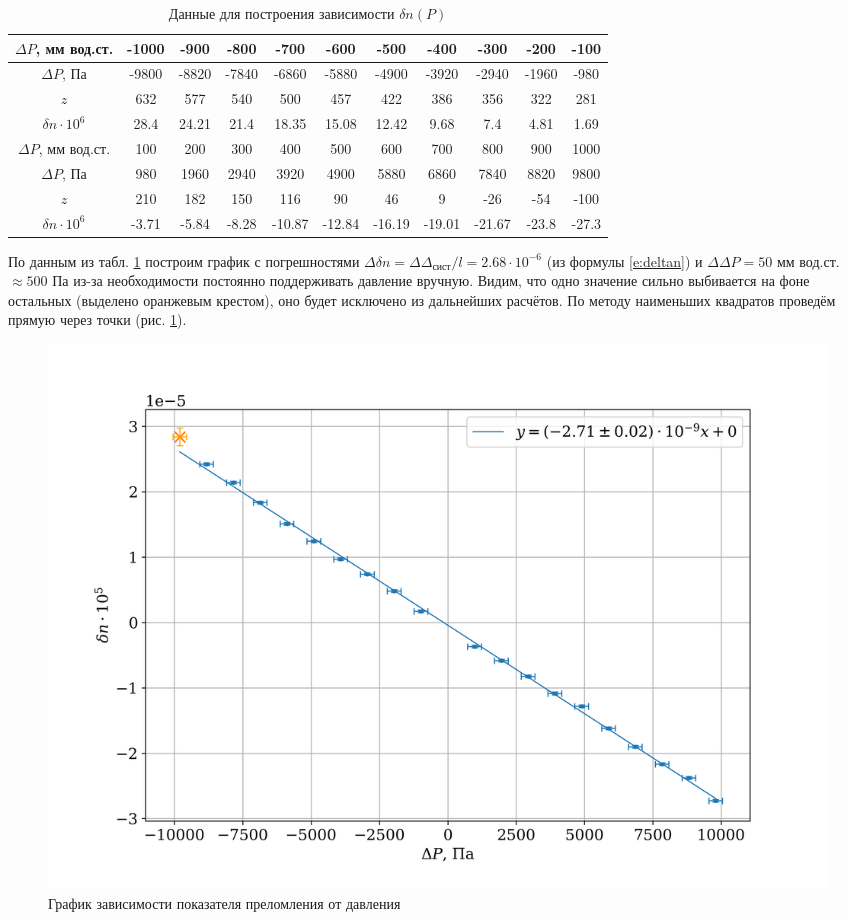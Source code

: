 \documentclass[a4paper,12pt]{article} %
\begin{document}
\begin{table}
\centering
\footnotesize
\begin{tabular}{|c|c|c|c|c|c|c|c|c|c|c|}
\hline 
$\Delta P$, мм вод.ст. & -1000 & -900 & -800 & -700 & -600 & -500 & -400 & -300 & -200 & -100\\
\hline
$\Delta P$, Па & -9800 & -8820 & -7840 & -6860 & -5880 & -4900 & -3920 & -2940 & -1960 & -980\\
\hline
$z$ & 632 & 577 & 540 & 500 & 457 & 422 & 386 & 356 & 322 & 281\\
\hline
$\delta n \cdot 10^6$ & 28.4 & 24.21 & 21.4 & 18.35 & 15.08 & 12.42 & 9.68 & 7.4 & 4.81 & 1.69\\
\hline
$\Delta P$, мм вод.ст. & 100 & 200 & 300 & 400 & 500 & 600 & 700 & 800 & 900 & 1000\\
\hline
$\Delta P$, Па & 980 & 1960 & 2940 & 3920 & 4900 & 5880 & 6860 & 7840 & 8820 & 9800\\
\hline
$z$ & 210 & 182 & 150 & 116 & 90 & 46 & 9 & -26 & -54 & -100\\
\hline
$\delta n \cdot 10^6$ & -3.71 & -5.84 & -8.28 & -10.87 & -12.84 & -16.19 & -19.01 & -21.67 & -23.8 & -27.3\\
\hline
\end{tabular} 
\caption{Данные для построения зависимости $\delta n (P)$}
\label{t:pres}
\end{table}

По данным из табл. \ref{t:pres} построим график с погрешностями $\Delta \delta n = \Delta \Delta_\text{сист} / l = 2.68 \cdot 10^{-6}$ (из формулы \ref{e:deltan}) и $\Delta \Delta P = 50$ мм вод.ст. $\approx 500$ Па из-за необходимости постоянно поддерживать давление вручную. Видим, что одно значение сильно выбивается на фоне остальных (выделено оранжевым крестом), оно будет исключено из дальнейших расчётов. По методу наименьших квадратов проведём прямую через точки (рис. \ref{f:pres}).

\begin{figure}
\centering
\includegraphics[width=\textwidth]{plot2.png}
\caption{График зависимости показателя преломления от давления}
\label{f:pres}
\end{figure}
\end{document}
